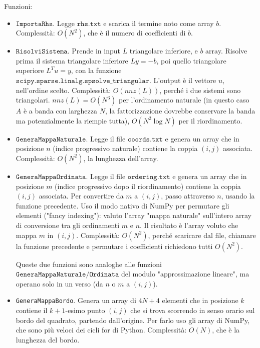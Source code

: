 \documentclass{article}
\begin{document}
Funzioni:
\begin{itemize}
\item $\texttt{ImportaRhs}$.
Legge $\texttt{rhs.txt}$ e scarica il termine noto come array $b$.
Complessità: $O(N^2)$, che è il numero di coefficienti di $b$.

\item $\texttt{RisolviSistema}$.
Prende in input $L$ triangolare inferiore, e $b$ array.
Risolve prima il sistema triangolare inferiore $Ly = -b$, poi quello triangolare superiore $L^T u= y$, con la funzione $\texttt{scipy.sparse.linalg.spsolve\_triangular}$.
L'output è il vettore $u$, nell'ordine scelto.
Complessità: $O(nnz(L))$, perché i due sistemi sono triangolari. $nnz(L) = O(N^3)$ per l'ordinamento naturale (in questo caso $A$ è a banda con larghezza $N$, la fattorizzazione dovrebbe conservare la banda ma potenzialmente la riempie tutta), $O(N^2 \log N)$ per il riordinamento.


\item $\texttt{GeneraMappaNaturale}$.
Legge il file $\texttt{coords.txt}$ e genera un array che in posizione $n$ (indice progressivo naturale) contiene la coppia $(i,j)$ associata. Complessità: $O(N^2)$, la lunghezza dell'array.

\item $\texttt{GeneraMappaOrdinata}$.
Legge il file $\texttt{ordering.txt}$ e genera un array che in posizione $m$ (indice progressivo dopo il riordinamento) contiene la coppia $(i,j)$ associata.
Per convertire da $m$ a $(i,j)$, passo attraverso $n$, usando la funzione precedente.
Uso il modo nativo di NumPy per permutare gli elementi ("fancy indexing"): valuto l'array "mappa naturale" sull'intero array di conversione tra gli ordinamenti $m$ e $n$.
Il risultato è l'array voluto che mappa $m$ in $(i,j)$.
Complessità: $O(N^2)$, perché scaricare dal file, chiamare la funzione precedente e permutare i coefficienti richiedono tutti $O(N^2)$.

Queste due funzioni sono analoghe alle funzioni $\texttt{GeneraMappaNaturale/Ordinata}$ del modulo "approssimazione lineare", ma operano solo in un verso (da $n$ o $m$ a $(i,j)$).

\item \texttt{GeneraMappaBordo}.
Genera un array di $4N+4$ elementi che in posizione $k$ contiene il $k+1$-esimo punto $(i,j)$ che si trova scorrendo in senso orario sul bordo del quadrato, partendo dall'origine.
Per farlo uso gli array di NumPy, che sono più veloci dei cicli for di Python. Complessità: $O(N)$, che è la lunghezza del bordo.


\end{itemize}
\end{document}

